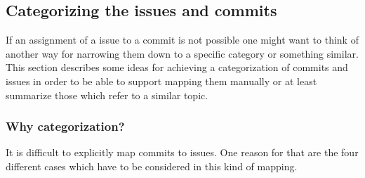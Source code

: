 \subsection{Categorizing the issues and commits}

If an assignment of a issue to a commit is not possible one might want to think of another way for narrowing them down to a specific category or something similar.
This section describes some ideas for achieving a categorization of commits and issues in order to be able to support mapping them manually or at least summarize those which refer to a similar topic.

\subsubsection{Why categorization?}

It is difficult to explicitly map commits to issues.
One reason for that are the four different cases which have to be considered in this kind of mapping.\\

